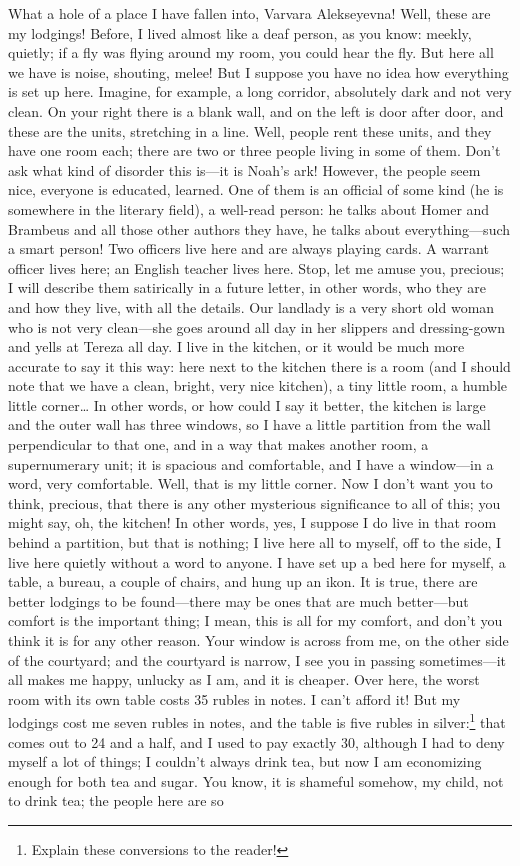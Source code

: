 What a hole of a place I have fallen into, Varvara Alekseyevna! Well, these are my lodgings! Before, I lived almost like a deaf person, as you know: meekly, quietly; if a fly was flying around my room, you could hear the fly. But here all we have is noise, shouting, melee! But I suppose you have no idea how everything is set up here. Imagine, for example, a long corridor, absolutely dark and not very clean. On your right there is a blank wall, and on the left is door after door, and these are the units, stretching in a line. Well, people rent these units, and they have one room each; there are two or three people living in some of them. Don't ask what kind of disorder this is---it is Noah's ark! However, the people seem nice, everyone is educated, learned. One of them is an official of some kind (he is somewhere in the literary field), a well-read person: he talks about Homer and Brambeus and all those other authors they have, he talks about everything---such a smart person! Two officers live here and are always playing cards. A warrant officer lives here; an English teacher lives here. Stop, let me amuse you, precious; I will describe them satirically in a future letter, in other words, who they are and how they live, with all the details. Our landlady is a very short old woman who is not very clean---she goes around all day in her slippers and dressing-gown and yells at Tereza all day. I live in the kitchen, or it would be much more accurate to say it this way: here next to the kitchen there is a room (and I should note that we have a clean, bright, very nice kitchen), a tiny little room, a humble little corner\ldots{} In other words, or how could I say it better, the kitchen is large and the outer wall has three windows, so I have a little partition from the wall perpendicular to that one, and in a way that makes another room, a supernumerary unit; it is spacious and comfortable, and I have a window---in a word, very comfortable. Well, that is my little corner. Now I don't want you to think, precious, that there is any other mysterious significance to all of this; you might say, oh, the kitchen! In other words, yes, I suppose I do live in that room behind a partition, but that is nothing; I live here all to myself, off to the side, I live here quietly without a word to anyone. I have set up a bed here for myself, a table, a bureau, a couple of chairs, and hung up an ikon. It is true, there are better lodgings to be found---there may be ones that are much better---but comfort is the important thing; I mean, this is all for my comfort, and don't you think it is for any other reason. Your window is across from me, on the other side of the courtyard; and the courtyard is narrow, I see you in passing sometimes---it all makes me happy, unlucky as I am, and it is cheaper. Over here, the worst room with its own table costs 35 rubles in notes. I can't afford it! But my lodgings cost me seven rubles in notes, and the table is five rubles in silver:\footnote{Explain these conversions to the reader!} that comes out to 24 and a half, and I used to pay exactly 30, although I had to deny myself a lot of things; I couldn't always drink tea, but now I am economizing enough for both tea and sugar. You know, it is shameful somehow, my child, not to drink tea; the people here are so 